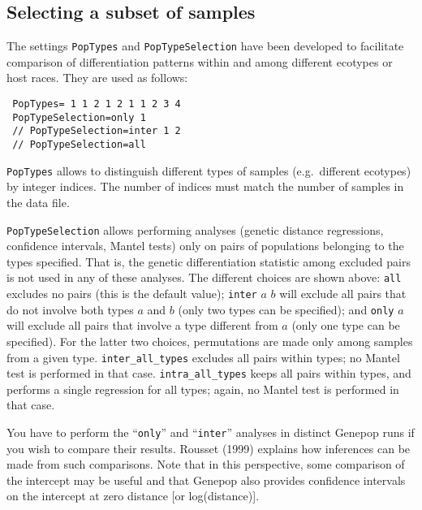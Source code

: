 \documentclass[
  12pt,
]{book}
\begin{document}
\hypertarget{selecting-a-subset-of-samples}{%
\subsection{Selecting a subset of samples}\label{selecting-a-subset-of-samples}}

The settings \texttt{PopTypes} and \texttt{PopTypeSelection} have been developed to facilitate comparison of differentiation patterns within and among different ecotypes or host races. They are used as follows:

\begin{verbatim}
 PopTypes= 1 1 2 1 2 1 1 2 3 4
 PopTypeSelection=only 1
 // PopTypeSelection=inter 1 2
 // PopTypeSelection=all
\end{verbatim}

\texttt{PopTypes} allows to distinguish different types of samples (e.g.~different ecotypes) by integer indices. The number of indices must match the number of samples in the data file.

\texttt{PopTypeSelection} allows performing analyses (genetic distance regressions, confidence intervals, Mantel tests) only on pairs of populations belonging to the types specified. That is, the genetic differentiation statistic among excluded pairs is not used in any of these analyses. The different choices are shown above: \texttt{all} excludes no pairs (this is the default value); \texttt{inter} \(a\) \(b\) will exclude all pairs that do not involve both types \(a\) and \(b\) (only two types can be specified); and \texttt{only} \(a\) will exclude all pairs that involve a type different from \(a\) (only one type can be specified). For the latter two choices, permutations are made only among samples from a given type. \texttt{inter\_all\_types} excludes all pairs within types; no Mantel test is performed in that case. \texttt{intra\_all\_types} keeps all pairs within types, and performs a single regression for all types; again, no Mantel test is performed in that case.

You have to perform the ``\texttt{only}'' and ``\texttt{inter}'' analyses in distinct Genepop runs if you wish to compare their results. Rousset (1999) explains how inferences can be made from such comparisons. Note that in this perspective, some comparison of the intercept may be useful and that Genepop also provides confidence intervals on the intercept at zero distance {[}or log(distance){]}.
\end{document}
